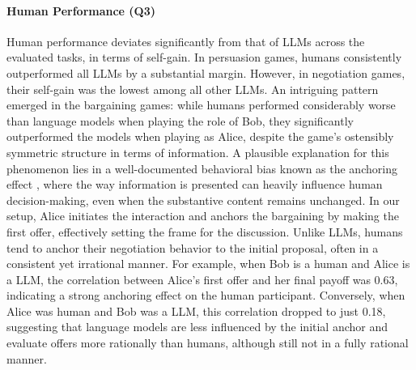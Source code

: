 \paragraph{Human Performance (Q3)} Human performance deviates significantly from that of LLMs across the evaluated tasks, in terms of self-gain. In persuasion games, humans consistently outperformed all LLMs by a substantial margin. However, in negotiation games, their self-gain was the lowest among all other LLMs.
An intriguing pattern emerged in the bargaining games: while humans performed considerably worse than language models when playing the role of Bob, they significantly outperformed the models when playing as Alice, despite the game's ostensibly symmetric structure in terms of information.
A plausible explanation for this phenomenon lies in a well-documented behavioral bias known as the anchoring effect \cite{tversky1974judgment}, where the way information is presented can heavily influence human decision-making, even when the substantive content remains unchanged. In our setup, Alice initiates the interaction and anchors the bargaining by making the first offer, effectively setting the frame for the discussion. Unlike LLMs, humans tend to anchor their negotiation behavior to the initial proposal, often in a consistent yet irrational manner.
For example, when Bob is a human and Alice is a LLM, the correlation between Alice's first offer and her final payoff was 0.63, indicating a strong anchoring effect on the human participant. Conversely, when Alice was human and Bob was a LLM, this correlation dropped to just 0.18, suggesting that language models are less influenced by the initial anchor and evaluate offers more rationally than humans, although still not in a fully rational manner.
 

